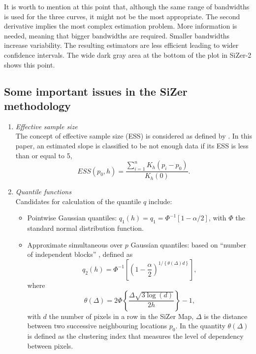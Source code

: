 \documentclass[preprint,12pt]{elsarticle}
\begin{document}
It is worth to mention at this point that, although  the same range of bandwidths is used for the three curves, it might not be the most appropriate. The second derivative implies the most complex estimation problem. More information is needed, meaning that bigger bandwidths are required. Smaller bandwidths increase variability. The resulting estimators are less efficient leading to wider confidence intervals. The wide dark gray area at the bottom of the plot in SiZer-2 shows this point.


\subsection{Some important issues in the SiZer methodology}
\begin{enumerate}
\item {\it Effective sample size} \\
\noindent The  concept of effective sample size (ESS) is considered as defined by \cite{CM99}. In this paper, an estimated slope is classified to be not enough data if its ESS is less than or equal to 5, 
$$
ESS(p_0,h) = \frac{\sum_{i=1}^n K_h(p_i-p_0)}{K_h(0)}.
$$

\item {\it Quantile functions} \\
\noindent Candidates for calculation of the quantile $q$ include:
\begin{itemize}
	\item Pointwise Gaussian quantiles: $q_1(h) = q_1 = \Phi^{-1}[1-\alpha/2]$, with $\Phi$ the standard normal distribution function. 
	\item Approximate simultaneous over $p$ Gaussian quantiles: based on ``number of independent blocks'' \cite{HM2006}, defined as
	$$
	q_2(h) = \Phi^{-1} \left[\left(1- \frac{\alpha}{2}\right)^{1/\left\{\theta(\Delta)d\right\}}\right],
	$$
	where
	$$
	\theta(\Delta) =2 \Phi \left\{ \frac{\Delta \sqrt{3 \log(d)}}{2h}\right\}-1,
	$$
	with $d$ the number of pixels in a row in the SiZer Map, $\Delta$ is the distance between two successive neighbouring locations $p_0$. In \cite{HM2006} the quantity $\theta(\Delta)$ is defined as the clustering index that measures the level of dependency between pixels. 
\end{itemize}
\end{enumerate}
\end{document}
